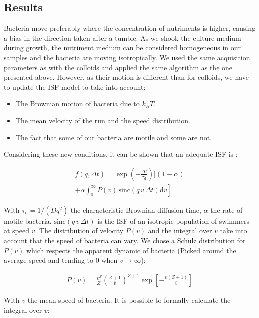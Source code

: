 \documentclass[%
 aip,
 jmp,%
 amsmath,amssymb,
reprint,%
]{revtex4-1}
\begin{document}
\subsection{Results}

Bacteria move preferably where the concentration of nutriments is higher, causing a bias in the direction taken after a tumble. As we shook the culture medium during growth, the nutriment medium can be considered homogeneous in our samples and the bacteria are moving isotropically. We used the same acquisition parameters as with the colloids and applied the same algorithm as the one presented above. However, as their motion is different than for colloids, we have to update the ISF model to take into account:

\begin{itemize}
\item The Brownian motion of bacteria due to $k_BT$.
\item The mean velocity of the run and the speed distribution.
\item The fact that some of our bacteria are motile and some are not.
\end{itemize}

Considering these new conditions, it can be shown that an adequate ISF is \citep{1_BactMobil}:

\begin{multline}
f(q, \Delta t) = \exp\left(-\frac{\Delta t}{\tau_\text{d}}\right) \bigg[(1-\alpha)\\
\left. + \alpha \int_{0}^{\infty} P(v)\, \text{sinc}(q\, v\, \Delta t) \mathrm{d}v \right]
\end{multline}

With $\tau_\text{d} = 1/(Dq^2)$ the characteristic Brownian diffusion time, $\alpha$ the rate of motile bacteria. $\text{sinc}(q\, v\, \Delta t)$ is the ISF of an isotropic population of swimmers at speed $v$. The distribution of velocity $P(v)$ and the integral over $v$ take into account that the speed of bacteria can vary. We chose a Schulz distribution for $P(v)$ which respects the apparent dynamic of bacteria (Picked around the average speed and tending to 0 when $v \rightarrow \infty$):

\begin{multline}
P(v) = \frac{v^Z}{Z!} \left(\frac{Z+1}{\overline{v}}\right)^{Z+1} \exp\left[-\frac{v(Z+1)}{\overline{v}}\right]
\end{multline}

With $\overline{v}$ the mean speed of bacteria.
It is possible to formally calculate the integral over $v$:
\end{document}
